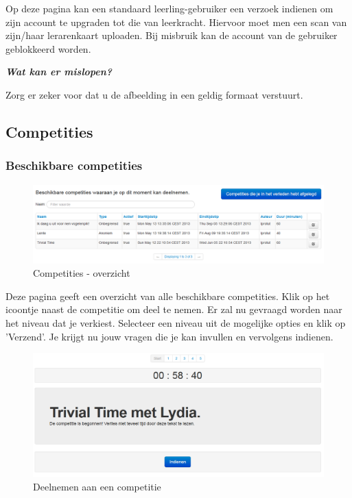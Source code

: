\documentclass[]{article}
\begin{document}
Op deze pagina kan een standaard leerling-gebruiker een verzoek indienen om zijn account te upgraden tot die van leerkracht. Hiervoor moet men een scan van zijn/haar lerarenkaart uploaden. Bij misbruik kan de account van de gebruiker geblokkeerd worden.

\textbf{\textit{Wat kan er mislopen?}}

Zorg er zeker voor dat u de afbeelding in een geldig formaat verstuurt.

\subsection{Competities}

\subsubsection{Beschikbare competities}

\begin{figure}[!ht]
	\centering
	\includegraphics[width=1\textwidth]{img/comp}
	\caption{Competities - overzicht}
	\label{comp}
\end{figure}

Deze pagina geeft een overzicht van alle beschikbare competities. Klik op het icoontje naast de competitie om deel te nemen. Er zal nu gevraagd worden naar het niveau dat je verkiest. Selecteer een niveau uit de mogelijke opties en klik op 'Verzend'. Je krijgt nu jouw vragen die je kan invullen en vervolgens indienen.

\begin{figure}[!ht]
	\centering
	\includegraphics[width=1\textwidth]{img/startcomp}
	\caption{Deelnemen aan een competitie}
	\label{startcomp}
\end{figure}
\end{document}
